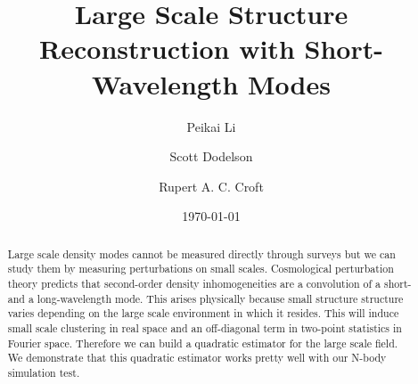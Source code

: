 \documentclass[prd,amsmath,amssymb,floatfix,superscriptaddress,nofootinbib,twocolumn]{revtex4-1}
\begin{document}
\title{Large Scale Structure Reconstruction with Short-Wavelength Modes}
\author{\large Peikai Li}
\author{\large Scott Dodelson}
\author{\large Rupert A. C. Croft}

\date{\today}
\begin{abstract}
\noindent Large scale density modes cannot be measured directly through surveys but we can study them by measuring perturbations on small scales. Cosmological perturbation theory predicts that second-order density inhomogeneities are a convolution of a short- and a long-wavelength mode. This arises physically because small structure structure varies depending on the large scale environment in which it resides. This will induce small scale clustering in real space and an off-diagonal term in two-point statistics in Fourier space. Therefore we can build a quadratic estimator for the large scale field. We demonstrate that this quadratic estimator works pretty well with our N-body simulation test.

\end{abstract}
\maketitle
\end{document}

